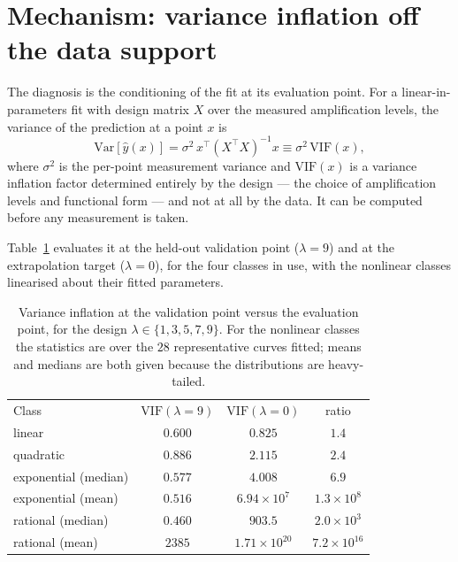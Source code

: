 \documentclass[aps,prx,twocolumn,superscriptaddress,nofootinbib,floatfix]{revtex4-2}
\begin{document}
\section{Mechanism: variance inflation off the data support}

The diagnosis is the conditioning of the fit at its evaluation point. For
a linear-in-parameters fit with design matrix $X$ over the measured
amplification levels, the variance of the prediction at a point $x$ is
\begin{equation}
\mathrm{Var}[\hat y(x)] = \sigma^2\, x^\top (X^\top X)^{-1} x
\equiv \sigma^2\, \mathrm{VIF}(x),
\end{equation}
where $\sigma^2$ is the per-point measurement variance and
$\mathrm{VIF}(x)$ is a variance inflation factor determined entirely by
the design --- the choice of amplification levels and functional form ---
and not at all by the data. It can be computed before any measurement is
taken.

Table~\ref{tab:vif} evaluates it at the held-out validation point
($\lambda=9$) and at the extrapolation target ($\lambda=0$), for the four
classes in use, with the nonlinear classes linearised about their fitted
parameters.

\begin{table}[t]
\caption{Variance inflation at the validation point versus the evaluation
point, for the design $\lambda\in\{1,3,5,7,9\}$. For the nonlinear classes
the statistics are over the $28$ representative curves fitted; means and
medians are both given because the distributions are heavy-tailed.}
\label{tab:vif}
\begin{ruledtabular}
\begin{tabular}{lccc}
Class & $\mathrm{VIF}(\lambda{=}9)$ & $\mathrm{VIF}(\lambda{=}0)$ & ratio \\
\colrule
linear      & $0.600$ & $0.825$ & $1.4$ \\
quadratic   & $0.886$ & $2.115$ & $2.4$ \\
exponential (median) & $0.577$ & $4.008$ & $6.9$ \\
exponential (mean)   & $0.516$ & $6.94\times10^{7}$ & $1.3\times10^{8}$ \\
rational (median)    & $0.460$ & $903.5$ & $2.0\times10^{3}$ \\
rational (mean)      & $2385$  & $1.71\times10^{20}$ & $7.2\times10^{16}$ \\
\end{tabular}
\end{ruledtabular}
\end{table}
\end{document}
